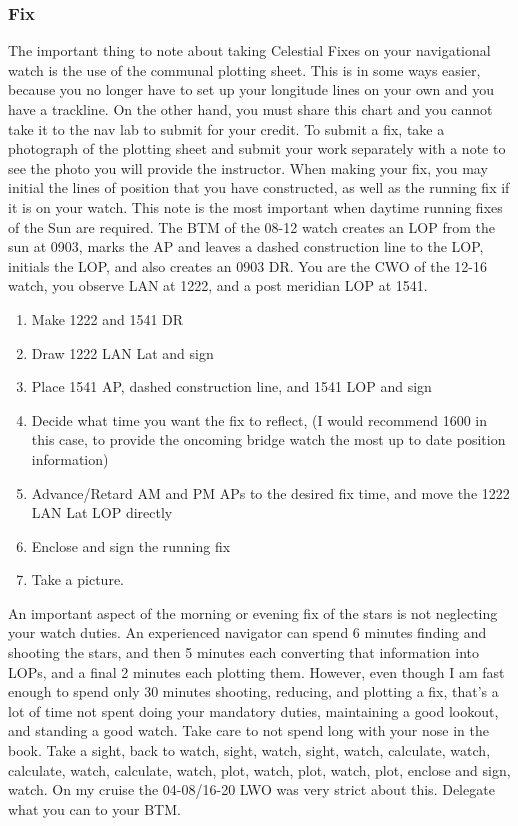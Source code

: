 \documentclass[letterpaper,12pt]{article}
\begin{document}
\subsubsection{Fix}
The important thing to note about taking Celestial Fixes on your navigational watch is the use of the communal plotting sheet.
This is in some ways easier, because you no longer have to set up your longitude lines on your own and you have a trackline.
On the other hand, you must share this chart and you cannot take it to the nav lab to submit for your credit.
To submit a fix, take a photograph of the plotting sheet and submit your work separately with a note to see the photo you will provide the instructor.
When making your fix, you may initial the lines of position that you have constructed, as well as the running fix if it is on your watch.
This note is the most important when daytime running fixes of the Sun are required.
The BTM of the 08-12 watch creates an LOP from the sun at 0903, marks the AP and leaves a dashed construction line to the LOP, initials the LOP, and also creates an 0903 DR.
You are the CWO of the 12-16 watch, you observe LAN at 1222, and a post meridian LOP \astrosun{} at 1541. 
\begin{enumerate}
	\item Make 1222 and 1541 DR
	\item Draw 1222 LAN Lat and sign
	\item Place 1541 AP, dashed construction line, and 1541 LOP and sign
	\item Decide what time you want the fix to reflect, (I would recommend 1600 in this case, to provide the oncoming bridge watch the most up to date position information)
	\item Advance/Retard AM and PM APs to the desired fix time, and move the 1222 LAN Lat LOP directly
	\item Enclose and sign the running fix
	\item Take a picture.
\end{enumerate}

An important aspect of the morning or evening fix of the stars is not neglecting your watch duties.
An experienced navigator can spend 6 minutes finding and shooting the stars, and then 5 minutes each converting that information into LOPs, and a final 2 minutes each plotting them. 
However, even though I am fast enough to spend only 30 minutes shooting, reducing, and plotting a fix, that's a lot of time not spent doing your mandatory duties, maintaining a good lookout, and standing a good watch.
Take care to not spend long with your nose in the book.
Take a sight, back to watch, sight, watch, sight, watch, calculate, watch, calculate, watch, calculate, watch, plot, watch, plot, watch, plot, enclose and sign, watch.
On my cruise the 04-08/16-20 LWO was very strict about this.
Delegate what you can to your BTM.
\end{document}
